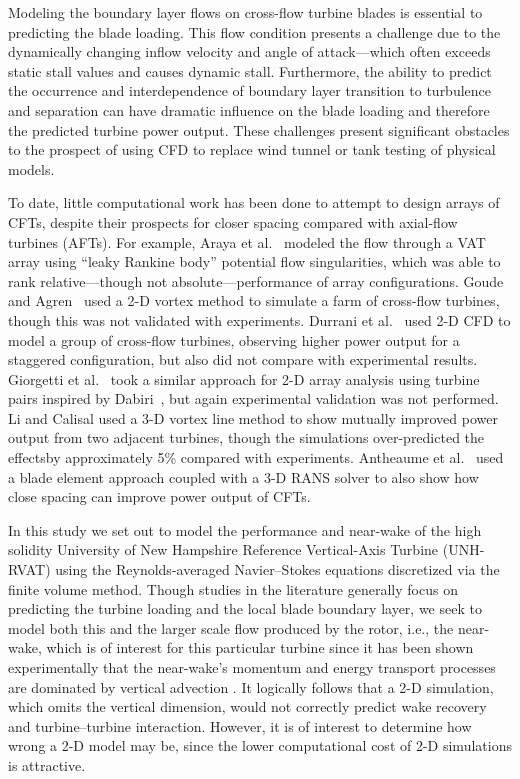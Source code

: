 Modeling the boundary layer flows on cross-flow turbine blades is essential to
predicting the blade loading. This flow condition presents a challenge due to
the dynamically changing inflow velocity and angle of attack---which often
exceeds static stall values and causes dynamic stall. Furthermore, the ability
to predict the occurrence and interdependence of boundary layer transition to
turbulence and separation can have dramatic influence on the blade loading and
therefore the predicted turbine power output. These challenges present
significant obstacles to the prospect of using CFD to replace wind tunnel or
tank testing of physical models.

To date, little computational work has been done to attempt to design arrays of
CFTs, despite their prospects for closer spacing compared with axial-flow
turbines (AFTs). For example, Araya et al.~\cite{Araya2014} modeled the flow
through a VAT array using ``leaky Rankine body'' potential flow singularities,
which was able to rank relative---though not absolute---performance of array
configurations. Goude and Agren~\cite{Goude2010} used a 2-D vortex method to
simulate a farm of cross-flow turbines, though this was not validated with
experiments. Durrani et al.~\cite{Durrani2011} used 2-D CFD to model a group of
cross-flow turbines, observing higher power output for a staggered
configuration, but also did not compare with experimental results. Giorgetti et
al.~\cite{Giorgetti2015} took a similar approach for 2-D array analysis using
turbine pairs inspired by Dabiri~\cite{Dabiri2011}, but again experimental
validation was not performed. Li and Calisal \cite{Li2010} used a 3-D vortex
line method to show mutually improved power output from two adjacent turbines,
though the simulations over-predicted the effectsby approximately 5\% compared
with experiments. Antheaume et al.~\cite{Antheaume2008} used a blade element
approach coupled with a 3-D RANS solver to also show how close spacing can
improve power output of CFTs.

In this study we set out to model the performance and near-wake of the high
solidity University of New Hampshire Reference Vertical-Axis Turbine (UNH-RVAT)
using the Reynolds-averaged Navier--Stokes equations discretized via the finite
volume method. Though studies in the literature generally focus on predicting
the turbine loading and the local blade boundary layer, we seek to model both
this and the larger scale flow produced by the rotor, i.e., the near-wake, which
is of interest for this particular turbine since it has been shown
experimentally that the near-wake's momentum and energy transport processes are
dominated by vertical advection \cite{Bachant2015-JoT}. It logically follows
that a 2-D simulation, which omits the vertical dimension, would not correctly
predict wake recovery and turbine--turbine interaction. However, it is of
interest to determine how wrong a 2-D model may be, since the lower
computational cost of 2-D simulations is attractive.

